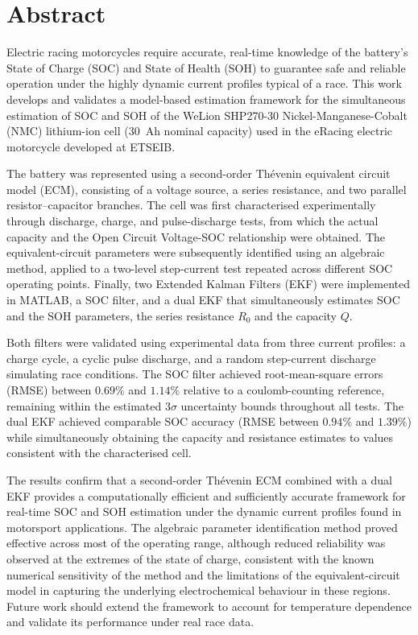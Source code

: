 \chapter*{Abstract}\label{sec:Abstract}

\begin{sloppy}

Electric racing motorcycles require accurate, real-time knowledge of the battery's 
State of Charge (SOC) and State of Health (SOH) to guarantee safe and reliable 
operation under the highly dynamic current profiles typical of a race. This work 
develops and validates a model-based estimation framework for the simultaneous 
estimation of SOC and SOH of the WeLion SHP270-30 Nickel-Manganese-Cobalt (NMC) 
lithium-ion cell (30~Ah nominal capacity) used in the eRacing electric 
motorcycle developed at ETSEIB.

The battery was represented using a second-order Thévenin equivalent circuit model 
(ECM), consisting of a voltage source, a series resistance, and 
two parallel resistor--capacitor branches. The cell was first characterised 
experimentally through discharge, charge, and pulse-discharge tests, from which the 
actual capacity and the Open Circuit Voltage-SOC relationship were obtained. The 
equivalent-circuit parameters were subsequently identified using an algebraic method, 
applied to a two-level step-current test repeated across different 
SOC operating points. Finally, two Extended Kalman Filters (EKF) were 
implemented in MATLAB, a SOC filter, and a dual EKF that simultaneously estimates 
SOC and the SOH parameters, the series resistance $R_0$ and the 
capacity $Q$.

Both filters were validated using experimental data from three current profiles: a 
charge cycle, a cyclic pulse discharge, and a random step-current discharge simulating 
race conditions. The SOC filter achieved root-mean-square errors (RMSE) between 
$0.69\%$ and $1.14\%$ relative to a coulomb-counting reference, remaining within the 
estimated $3\sigma$ uncertainty bounds throughout all tests. The dual EKF achieved 
comparable SOC accuracy (RMSE between $0.94\%$ and $1.39\%$) while simultaneously 
obtaining the capacity and resistance estimates to values consistent with the 
characterised cell.

The results confirm that a second-order Thévenin ECM combined with a dual EKF 
provides a computationally efficient and sufficiently accurate framework for 
real-time SOC and SOH estimation under the dynamic current profiles found in 
motorsport applications. The algebraic parameter identification method proved 
effective across most of the operating range, although reduced reliability was 
observed at the extremes of the state of charge, consistent with the known numerical 
sensitivity of the method and the limitations of the equivalent-circuit model in 
capturing the underlying electrochemical behaviour in these regions. Future work 
should extend the framework to account for temperature dependence and validate its 
performance under real race data.


\end{sloppy}

